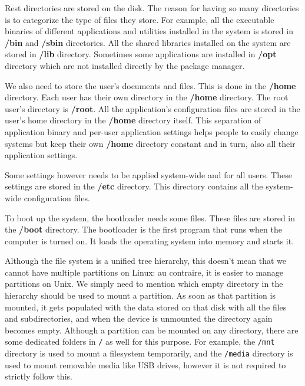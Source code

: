 Rest directories are stored on the disk.
The reason for having so many directories is to categorize the type of files they store.
For example, all the executable binaries of different applications and utilities installed in the system is stored in \textbf{/bin} and \textbf{/sbin} directories.
All the shared libraries installed on the system are stored in \textbf{/lib} directory.
Sometimes some applications are installed in \textbf{/opt} directory which are not installed directly by the package manager.

We also need to store the user's documents and files.
This is done in the \textbf{/home} directory.
Each user has their own directory in the \textbf{/home} directory.
The root user's directory is \textbf{/root}.
All the application's configuration files are stored in the user's home directory in the \textbf{/home} directory itself.
This separation of application binary and per-user application settings helps people to easily change systems but keep their own \textbf{/home} directory constant and in turn, also all their application settings.

Some settings however needs to be applied system-wide and for all users.
These settings are stored in the \textbf{/etc} directory.
This directory contains all the system-wide configuration files.

To boot up the system, the bootloader needs some files. These files are stored in the \textbf{/boot} directory.
The bootloader is the first program that runs when the computer is turned on. It loads the operating system into memory and starts it.

Although the file system is a unified tree hierarchy, this doesn't mean that we cannot have multiple partitions on Linux: au contraire, it is easier to manage partitions on Unix.
We simply need to mention which empty directory in the hierarchy should be used to mount a partition.
As soon as that partition is mounted, it gets populated with the data stored on that disk with all the files and subdirectories, and when the device is unmounted the directory again becomes empty.
Although a partition can be mounted on any directory, there are some dedicated folders in \texttt{/} as well for this purpose.
For example, the \texttt{/mnt} directory is used to mount a filesystem temporarily, and the \texttt{/media} directory is used to mount removable media like USB drives, however it is not required to strictly follow this.


